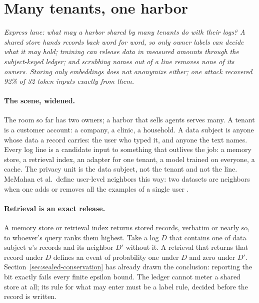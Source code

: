 \section{Many tenants, one harbor}\label{sec:sealed-tenants}

\noindent\emph{Express lane: what may a harbor shared by many tenants do with
their logs? A shared store hands records back word for word, so only owner
labels can decide what it may hold; training can release data in measured
amounts through the subject-keyed ledger; and scrubbing names out of a line
removes none of its owners. Storing only embeddings does not anonymize
either; one attack recovered 92\% of 32-token inputs exactly from them.}

\paragraph{The scene, widened.}
The room so far has two owners; a harbor that sells agents serves many. A
tenant is a customer account: a company, a clinic, a household. A
data subject is anyone whose data a record carries: the user who typed it,
and anyone the text names. Every log line is a candidate
input to something that outlives the job: a memory store, a retrieval index,
an adapter for one tenant, a
model trained on everyone, a cache. The privacy unit is the
data subject, not the tenant and not the line. McMahan et al.\ define user-level
neighbors this way: two datasets are neighbors when one adds or removes all
the examples of a single user .

\paragraph{Retrieval is an exact release.}
A memory store or retrieval index returns stored records, verbatim or nearly
so, to whoever's query ranks them highest. Take a log $D$ that contains one of
data subject $u$'s records and its neighbor $D'$ without it. A retrieval that
returns that record under $D$ defines an event of probability one under $D$
and zero under $D'$. Section~\ref{sec:sealed-conservation} has already drawn
the conclusion: reporting the bit exactly fails every finite epsilon bound.
The ledger cannot meter a shared store at all; its rule for what may enter
must be a label rule, decided before the record is written.

